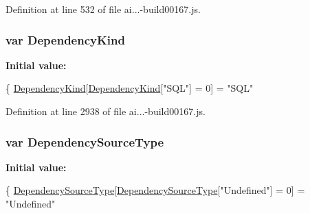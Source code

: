 Definition at line 532 of file ai...-\/build00167.\+js.

\subsubsection[{\texorpdfstring{Dependency\+Kind}{DependencyKind}}]{\setlength{\rightskip}{0pt plus 5cm}var Dependency\+Kind}\hypertarget{_scripts_2ai_80_822_89-build00167_8js_a42b5eb4744f3a19ea507f3e7b74a808b}{}\label{_scripts_2ai_80_822_89-build00167_8js_a42b5eb4744f3a19ea507f3e7b74a808b}
{\bfseries Initial value\+:}
\begin{DoxyCode}
\{
        \hyperlink{obj_2_release_2_package_2_package_tmp_2_scripts_2ai_80_822_89-build00167_8js_a42b5eb4744f3a19ea507f3e7b74a808b}{DependencyKind}[\hyperlink{obj_2_release_2_package_2_package_tmp_2_scripts_2ai_80_822_89-build00167_8js_a42b5eb4744f3a19ea507f3e7b74a808b}{DependencyKind}[\textcolor{stringliteral}{"SQL"}] = 0] = \textcolor{stringliteral}{"SQL"}
\end{DoxyCode}


Definition at line 2938 of file ai...-\/build00167.\+js.

\subsubsection[{\texorpdfstring{Dependency\+Source\+Type}{DependencySourceType}}]{\setlength{\rightskip}{0pt plus 5cm}var Dependency\+Source\+Type}\hypertarget{_scripts_2ai_80_822_89-build00167_8js_a8f44f92d20d4040180c49d805388de55}{}\label{_scripts_2ai_80_822_89-build00167_8js_a8f44f92d20d4040180c49d805388de55}
{\bfseries Initial value\+:}
\begin{DoxyCode}
\{
        \hyperlink{obj_2_release_2_package_2_package_tmp_2_scripts_2ai_80_822_89-build00167_8js_a8f44f92d20d4040180c49d805388de55}{DependencySourceType}[\hyperlink{obj_2_release_2_package_2_package_tmp_2_scripts_2ai_80_822_89-build00167_8js_a8f44f92d20d4040180c49d805388de55}{DependencySourceType}[\textcolor{stringliteral}{"Undefined"}] = 0]
       = \textcolor{stringliteral}{"Undefined"}
\end{DoxyCode}



